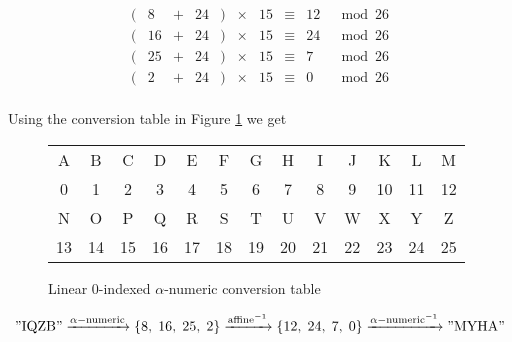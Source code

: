 \documentclass{article}
\begin{document}
$$\begin{matrix}
		( & 8  & + & 24 & ) & \times & 15 & \equiv & 12 & \mod 26 \\
		( & 16 & + & 24 & ) & \times & 15 & \equiv & 24 & \mod 26 \\
		( & 25 & + & 24 & ) & \times & 15 & \equiv & 7  & \mod 26 \\
		( & 2  & + & 24 & ) & \times & 15 & \equiv & 0  & \mod 26 \\
	\end{matrix}$$

Using the conversion table in Figure \ref{fig:conversion-table} we get

\begin{figure}[H]
	\centering
	\begin{tabular}{|c|c|c|c|c|c|c|c|c|c|c|c|c|}
		\hline
		A  & B  & C  & D  & E  & F  & G  & H  & I  & J  & K  & L  & M  \\
		0  & 1  & 2  & 3  & 4  & 5  & 6  & 7  & 8  & 9  & 10 & 11 & 12 \\
		\hline
		N  & O  & P  & Q  & R  & S  & T  & U  & V  & W  & X  & Y  & Z  \\
		13 & 14 & 15 & 16 & 17 & 18 & 19 & 20 & 21 & 22 & 23 & 24 & 25 \\
		\hline
	\end{tabular}
	\caption{Linear $0$-indexed $\alpha$-numeric conversion table}
	\label{fig:conversion-table}
\end{figure}

$$"\mathrm{IQZB}"\xrightarrow{\alpha-\mathrm{numeric}}\{8,\;16,\;25,\;2\}\xrightarrow{\mathrm{affine}^{-1}}\{12,\;24,\;7,\;0\}\xrightarrow{{\alpha-\mathrm{numeric}}^{-1}}"\mathrm{MYHA}"$$
\end{document}
